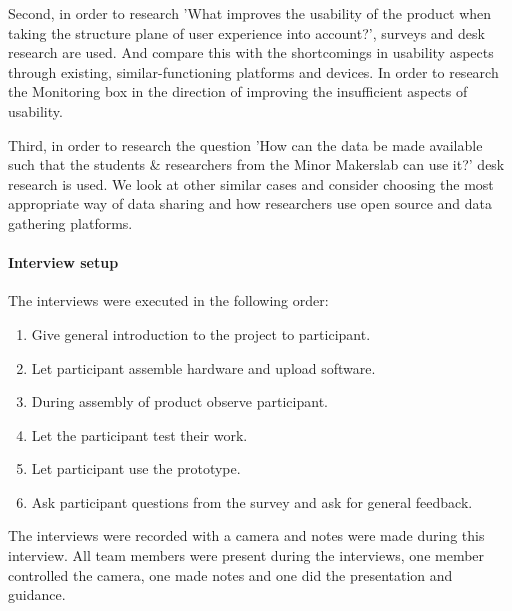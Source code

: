 \documentclass[conference]{IEEEtran}
\begin{document}
			Second, in order to research 'What improves the usability of the product when taking the structure plane of user experience into account?', surveys and desk research are used. And compare this with the shortcomings in usability aspects through existing, similar-functioning platforms and devices. In order to research the Monitoring box in the direction of improving the insufficient aspects of usability.

			Third, in order to research the question 'How can the data be made available such that the students \& researchers from the Minor Makerslab can use it?' desk research is used. We look at other similar cases and consider choosing the most appropriate way of data sharing and how researchers use open source and data gathering platforms.
		\paragraph{Interview setup} The interviews were executed in the following order:
			\begin{enumerate}
				\item Give general introduction to the project to participant.
				\item Let participant assemble hardware and upload software.
				\item During assembly of product observe participant.
				\item Let the participant test their work.
				\item Let participant use the prototype.
				\item Ask participant questions from the survey and ask for general feedback.
			\end{enumerate}
			The interviews were recorded with a camera and notes were made during this interview. All team members were present during the interviews, one member controlled the camera, one made notes and one did the presentation and guidance.
\end{document}
